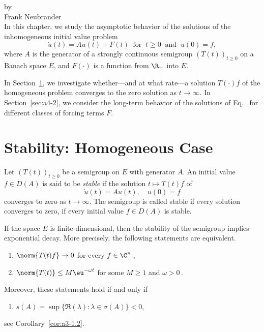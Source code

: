 \setcounter{section}{0}
\label{chap:a4}%
\thispagestyle{empty}
{\Large
\vspace*{-.75cm}
by \\[.25em]
Frank Neubrander
\vspace{.75cm}
\\
}
In this chapter, we study the asymptotic behavior of the solutions of the inhomogeneous initial value problem
\begin{equation}\label{eq:c4-1}
\dot{u}(t) = Au(t) + F(t) \ \text{ for } \  t \geq 0 \ \text{ and } \  
 u(0) = f, \tag{*}
\end{equation}
where $ A $ is the generator of a strongly continuous semigroup $ (T(t))_{t \geq 0} $ on a Banach space $ E $, and $ F(\cdot) $ is a function from $ \R_{+} $ into $ E $.

In Section~\ref{sec:a4-1}, we investigate whether---and at what rate---a solution $ T(\cdot)f $ of the homogeneous problem converges to the zero solution as $ t \to \infty $. 
In Section~\ref{sec:a4-2}, we consider the long-term behavior of the solutions of Eq.~\myeqpageref{eq:c4-1} for different classes of forcing terms $ F $.
\section{Stability: Homogeneous Case}\label{sec:a4-1}
Let $ (T(t))_{t \geq 0} $ be a semigroup on $ E $ with generator $ A $.
An initial value $ f \in D(A) $ is said to be \emph{stable} if the solution $ t \mapsto T(t)f $ of
\index{stability!stable}
\begin{equation}\label{eq:c4-2}
\dot{u}(t) = Au(t), \quad u(0) = f \tag{ACP}
\end{equation}
converges to zero as $ t \to \infty $. 
The semigroup is called stable if every solution converges to zero, \ie if every initial value $ f \in D(A) $ is stable.

If the space $ E $ is finite-dimensional, then the stability of the semigroup implies exponential decay. 
More precisely, the following statements are equivalent.
\begin{enumerate}[\upshape (a)]
\item 
$ \norm{T(t)f} \to 0 $ for every $ f \in \C^{n} $\,,

\item 
$ \norm{T(t)} \leq M \eu^{-\omega t} $ for some $M \geq 1$ and  $\omega > 0 $\,.
\end{enumerate}
Moreover, these statements hold if and only if
\begin{enumerate}
\item 
$s(A) = \sup\{\Re(\lambda) \colon \lambda \in \sigma(A)\} < 0$, 
\end{enumerate}
see Corollary~\ref{cor:a3-1.2}.

